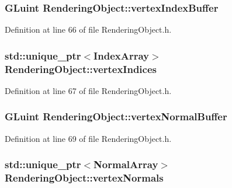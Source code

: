 \subsubsection[{vertex\+Index\+Buffer}]{\setlength{\rightskip}{0pt plus 5cm}G\+Luint Rendering\+Object\+::vertex\+Index\+Buffer\hspace{0.3cm}{\ttfamily [protected]}}\label{class_rendering_object_a6740a0a0e6bd4d841c9c211f2a31cca3}


Definition at line 66 of file Rendering\+Object.\+h.

\hypertarget{class_rendering_object_a7b84487d3c34c1ca36b2ac6060b0f802}{}
\subsubsection[{vertex\+Indices}]{\setlength{\rightskip}{0pt plus 5cm}std\+::unique\+\_\+ptr$<${\bf Index\+Array}$>$ Rendering\+Object\+::vertex\+Indices\hspace{0.3cm}{\ttfamily [protected]}}\label{class_rendering_object_a7b84487d3c34c1ca36b2ac6060b0f802}


Definition at line 67 of file Rendering\+Object.\+h.

\hypertarget{class_rendering_object_a91649e3a653f2266cd00c718f10849f9}{}
\subsubsection[{vertex\+Normal\+Buffer}]{\setlength{\rightskip}{0pt plus 5cm}G\+Luint Rendering\+Object\+::vertex\+Normal\+Buffer\hspace{0.3cm}{\ttfamily [protected]}}\label{class_rendering_object_a91649e3a653f2266cd00c718f10849f9}


Definition at line 69 of file Rendering\+Object.\+h.

\hypertarget{class_rendering_object_ac28d301f97d29ab603f65f8e823063b4}{}
\subsubsection[{vertex\+Normals}]{\setlength{\rightskip}{0pt plus 5cm}std\+::unique\+\_\+ptr$<${\bf Normal\+Array}$>$ Rendering\+Object\+::vertex\+Normals\hspace{0.3cm}{\ttfamily [protected]}}\label{class_rendering_object_ac28d301f97d29ab603f65f8e823063b4}



